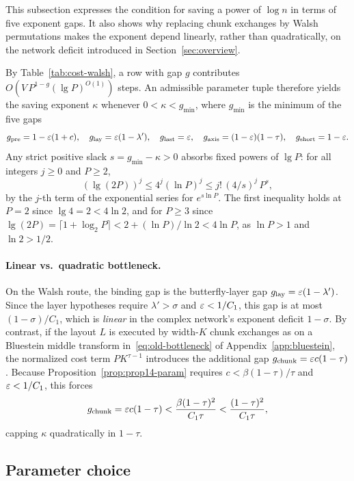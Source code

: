 This subsection expresses the condition for saving a power of $\log n$ in terms of five exponent gaps. It also shows why
replacing chunk exchanges by Walsh permutations makes the exponent depend linearly, rather than quadratically, on the
network deficit introduced in Section~\ref{sec:overview}.

By Table~\ref{tab:cost-walsh}, a row with gap $g$ contributes $O(V\,P^{1-g}(\lg P)^{O(1)})$ steps. An admissible
parameter tuple therefore yields the saving exponent $\kappa$ whenever $0<\kappa<g_{\min}$, where $g_{\min}$ is the
minimum of the five gaps
\begin{equation}\label{eq:gaps}
  g_{\rm pre}=1-\varepsilon(1+c),\quad g_{\rm lay}=\varepsilon(1-\lambda'),\quad g_{\rm last}=\varepsilon,\quad
  g_{\rm axis}=(1-\varepsilon)(1-\tau),\quad g_{\rm short}=1-\varepsilon.
\end{equation}
Any strict positive slack $s=g_{\min}-\kappa>0$ absorbs fixed powers of $\lg P$: for all integers $j\ge0$ and $P\ge2$,
\[
  (\lg(2P))^j\le4^j(\ln P)^j\le j!\,(4/s)^j\,P^{s},
\]
by the $j$-th term of the exponential series for $e^{s\ln P}$. The first inequality holds at $P=2$ since
$\lg 4=2<4\ln 2$, and for $P\ge3$ since $\lg(2P)=\lceil 1+\log_2 P\rceil<2+(\ln P)/\ln 2<4\ln P$, as $\ln P>1$ and
$\ln 2>1/2$.

\paragraph{Linear vs.\ quadratic bottleneck.}
On the Walsh route, the binding gap is the butterfly-layer gap $g_{\rm lay}=\varepsilon(1-\lambda')$. Since the layer
hypotheses require $\lambda'>\sigma$ and $\varepsilon<1/C_1$, this gap is at most $(1-\sigma)/C_1$, which is \emph{linear} in
the complex network's exponent deficit $1-\sigma$. By contrast, if the layout $L$ is executed by width-$K$ chunk
exchanges as on a Bluestein middle transform in~\eqref{eq:old-bottleneck} of Appendix~\ref{app:bluestein}, the
normalized cost term $PK^{\tau-1}$ introduces the additional gap $g_{\rm chunk}=\varepsilon c(1-\tau)$. Because
Proposition~\ref{prop:prop14-param} requires $c<\beta(1-\tau)/\tau$ and $\varepsilon<1/C_1$, this forces
\[
  g_{\rm chunk}=\varepsilon c(1-\tau)<\frac{\beta(1-\tau)^2}{C_1\tau}<\frac{(1-\tau)^2}{C_1\tau},
\]
capping $\kappa$ quadratically in $1-\tau$.

\subsection{Parameter choice}\label{sec:main-rows}

